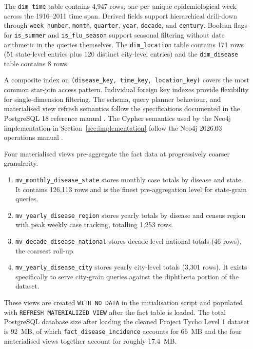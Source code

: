 \documentclass[12pt,a4paper]{article}
\begin{document}
The \texttt{dim\_time} table contains 4{,}947 rows, one per unique epidemiological week across the 1916--2011 time span. Derived fields support hierarchical drill-down through \texttt{week\_number}, \texttt{month}, \texttt{quarter}, \texttt{year}, \texttt{decade}, and \texttt{century}. Boolean flags for \texttt{is\_summer} and \texttt{is\_flu\_season} support seasonal filtering without date arithmetic in the queries themselves. The \texttt{dim\_location} table contains 171 rows (51 state-level entries plus 120 distinct city-level entries) and the \texttt{dim\_disease} table contains 8 rows.

A composite index on \texttt{(disease\_key, time\_key, location\_key)} covers the most common star-join access pattern. Individual foreign key indexes provide flexibility for single-dimension filtering. The schema, query planner behaviour, and materialised view refresh semantics follow the specifications documented in the PostgreSQL 18 reference manual \cite{pgdocs}. The Cypher semantics used by the Neo4j implementation in Section~\ref{sec:implementation} follow the Neo4j 2026.03 operations manual \cite{neo4jdocs}.

Four materialised views pre-aggregate the fact data at progressively coarser granularity.

\begin{enumerate}[leftmargin=2cm]
\item \texttt{mv\_monthly\_disease\_state} stores monthly case totals by disease and state. It contains 126{,}113 rows and is the finest pre-aggregation level for state-grain queries.
\item \texttt{mv\_yearly\_disease\_region} stores yearly totals by disease and census region with peak weekly case tracking, totalling 1{,}253 rows.
\item \texttt{mv\_decade\_disease\_national} stores decade-level national totals (46 rows), the coarsest roll-up.
\item \texttt{mv\_yearly\_disease\_city} stores yearly city-level totals (3{,}301 rows). It exists specifically to serve city-grain queries against the diphtheria portion of the dataset.
\end{enumerate}

These views are created \texttt{WITH NO DATA} in the initialisation script and populated with \texttt{REFRESH MATERIALIZED VIEW} after the fact table is loaded. The total PostgreSQL database size after loading the cleaned Project Tycho Level 1 dataset is 92~MB, of which \texttt{fact\_disease\_incidence} accounts for 66~MB and the four materialised views together account for roughly 17.4~MB.
\end{document}
